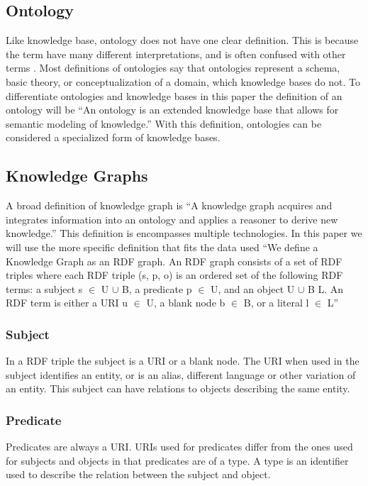 \subsection{Ontology}
Like knowledge base, ontology does not have one clear definition. This is because the term have many different interpretations, and is often confused with other terms \cite{FEILMAYR20161}. Most definitions of ontologies say that ontologies represent a schema, basic theory, or conceptualization of a domain, which knowledge bases do not. \cite{davies2006semantic} To differentiate ontologies and knowledge bases in this paper the definition of an ontology will be ``An ontology is an extended knowledge base that allows for semantic modeling of knowledge.'' With this definition, ontologies can be considered a specialized form of knowledge bases.

\subsection{Knowledge Graphs}
A broad definition of knowledge graph is ``A knowledge graph acquires and integrates information into an ontology and applies a reasoner to derive new knowledge.'' \cite{KGDef} This definition is encompasses multiple technologies. In this paper we will use the more specific definition that fits the data used ``We define a Knowledge Graph as an RDF graph. An RDF graph consists of a set of RDF triples where each RDF triple (s, p, o) is an ordered set of the following RDF terms: a subject s $\in$ U $\cup$ B, a predicate p $\in$ U, and an object U $\cup$ B  L. An RDF term is either a URI u $\in$ U, a blank node b $\in$ B, or a literal l $\in$ L'' \cite{KGDefYago}

\subsubsection{Subject}
In a RDF triple the subject is a URI or a blank node. The URI when used in the subject identifies an entity, or is an alias, different language or other variation of an entity. This subject can have relations to objects describing the same entity.

\subsubsection{Predicate}
Predicates are always a URI. URIs used for predicates differ from the ones used for subjects and objects in that predicates are of a type. A type is an identifier used to describe the relation between the subject and object.


